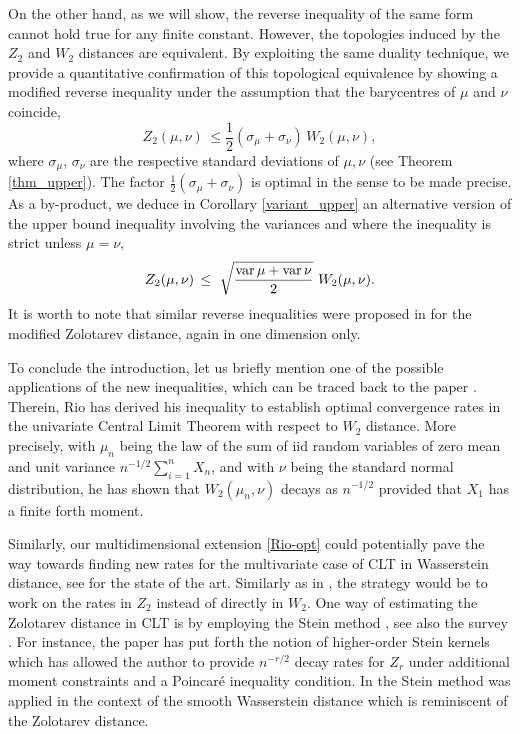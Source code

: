 \documentclass[11pt,reqno]{amsart}
\theoremstyle{definition}
\numberwithin{equation}{section}
\newcommand{\var}{{\rm{var}}}
\begin{document}
On the other hand,  as we will show, the reverse inequality of the same form cannot hold true for any finite constant. However, the topologies induced by the $Z_2$ and $W_2$ distances are equivalent.
By exploiting the same duality technique, we provide a quantitative confirmation  of this topological equivalence by showing a modified  reverse inequality under the assumption that the barycentres of $\mu$ and $\nu$ coincide,
$$ Z_2(\mu,\nu)\, \le \frac{1}{2} (\sigma_\mu +\sigma_\nu)  \, W_2(\mu,\nu) ,$$
where $\sigma_\mu$, $\sigma_\nu$ are the respective standard deviations of $\mu, \nu$ (see  Theorem \ref{thm_upper}). The factor $\frac{1}{2} (\sigma_\mu +\sigma_\nu)$ is optimal in the sense to be made precise. 
As a by-product, we deduce in Corollary \ref{variant_upper} an alternative version of the upper bound inequality involving the variances and where the inequality  is strict unless $\mu=\nu$,
\begin{equation}\label{new-upper}
Z_2(\mu,\nu) \, \leq \ \sqrt{\frac{\var\, \mu + \var\, \nu}{2}}\ W_2(\mu,\nu) .
\end{equation}
It is worth to note that similar reverse inequalities were proposed in \cite{bobkov2023} for the modified Zolotarev distance, again in one dimension only.


\medskip
To conclude the introduction, let us briefly mention one of the possible applications of the new inequalities, which  can be traced back to the paper \cite{rio2009}. Therein, Rio has derived his inequality to establish optimal convergence rates in the univariate Central Limit Theorem with respect to  $W_2$ distance. More precisely, with $\mu_n$ being the law of the sum of iid random variables of zero mean and unit variance $n^{-1/2} \sum_{i=1}^n X_n$, and with $\nu$ being the standard normal distribution, he has shown that $W_2(\mu_n,\nu)$ decays as $n^{-1/2}$ provided that $X_1$ has a finite forth moment. 

 Similarly, our multidimensional extension \eqref{Rio-opt} could potentially pave the way towards finding new rates for the multivariate case of CLT in Wasserstein distance, see \cite{bonis2020,bonis2024} for the state of the art. Similarly as in \cite{rio2009}, the strategy would be to work on the rates in $Z_2$ instead of directly in $W_2$.  One way of estimating  the Zolotarev distance in CLT is by employing  the Stein method \cite{stein1986}, see also the survey \cite{ross2011}. For instance, the paper \cite{fathi2021} has put forth the notion of higher-order Stein kernels which has allowed the author to provide $n^{-r/2}$ decay rates for $Z_r$ under  additional moment constraints and a Poincaré inequality condition. In \cite{gaunt2020} the Stein method was applied in the context of the smooth Wasserstein distance which is reminiscent of the Zolotarev distance.
\end{document}
